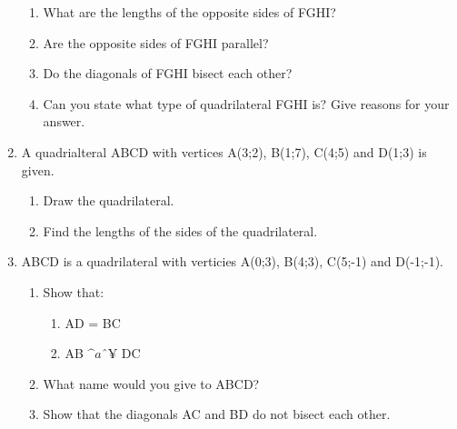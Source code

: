 \begin{enumerate}[noitemsep, label=\textbf{\arabic*}. ]
\begin{figure}[H]
\begin{center}
      \vspace{2pt}
    \vspace{.1in}
    
    \end{center}

 \end{figure}   

    \addtocounter{footnote}{-0}
    \label{m39167*id69695}\begin{enumerate}[noitemsep, label=\textbf{\alph*}. ] 
            \label{m39167*uid47}\item 
What are the lengths of the opposite sides of FGHI?
\label{m39167*uid48}\item Are the opposite sides of FGHI parallel?
\label{m39167*uid49}\item  Do the diagonals of FGHI bisect each other?
\label{m39167*uid50}\item  Can you state what type of quadrilateral FGHI is? Give reasons for your answer.
\end{enumerate}
                \label{m39167*uid51}\item 
A quadrialteral ABCD with vertices A(3;2), B(1;7), C(4;5) and D(1;3) is given.
\label{m39167*id69770}\begin{enumerate}[noitemsep, label=\textbf{\alph*}. ] 
            \label{m39167*uid52}\item  Draw the quadrilateral.
\label{m39167*uid53}\item  Find the lengths of the sides of the quadrilateral.
\end{enumerate}
                \label{m39167*uid54}\item ABCD is a quadrilateral with verticies A(0;3), B(4;3), C(5;-1) and D(-1;-1).
\label{m39167*id69816}\begin{enumerate}[noitemsep, label=\textbf{\alph*}. ] 
            \label{m39167*uid55}\item Show that:
\label{m39167*id69834}\begin{enumerate}[noitemsep, label=\textbf{\roman*}. ] 
            \label{m39167*uid56}\item AD = BC
\label{m39167*uid57}\item AB \begin{math}\^{a}ˆ¥\end{math} DC
\end{enumerate}
        \label{m39167*uid58}\item What name would you give to ABCD?
\label{m39167*uid59}\item Show that the diagonals AC and BD do not bisect each other.

\end{enumerate}
\end{enumerate}
